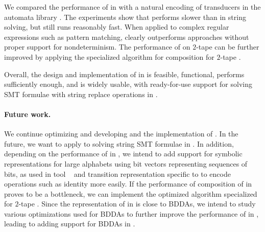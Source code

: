 We compared the performance of \nfts in \mata with a natural encoding of transducers in the automata library \mona.
The experiments show that \mata performs slower than \mona in string solving, but still runs reasonably fast.
When applied to complex regular expressions such as pattern matching, \mata clearly outperforms approaches without proper support for nondeterminism.
The performance of \mata on $2$-tape \nfts can be further improved by applying the specialized algorithm for composition for $2$-tape \nfts.

Overall, the design and implementation of \nfts in \mata is feasible, functional, performs sufficiently enough, and is widely usable, with ready-for-use support for solving SMT formulae with string replace operations in \noodler.

\paragraph{Future work.}
We continue optimizing and developing \mata and the implementation of \nfts.
In the future, we want to apply \nfts to solving string SMT formulae in \noodler.
In addition, depending on the performance of \nfts in \noodler, we intend to add support for symbolic representations for large alphabets using bit vectors representing sequences of bits, as used in tool \lash~\cite{lash} and transition representation specific to \nfts to encode \nft operations such as identity more easily.
If the performance of composition of \nfts in \noodler proves to be a bottleneck, we can implement the optimized algorithm specialized for $2$-tape \nfts.
Since the representation of \nfts in \mata is close to BDDAs, we intend to study various optimizations used for BDDAs to further improve the performance of \nfts in \mata, leading to adding support for BDDAs in \mata.


% 
